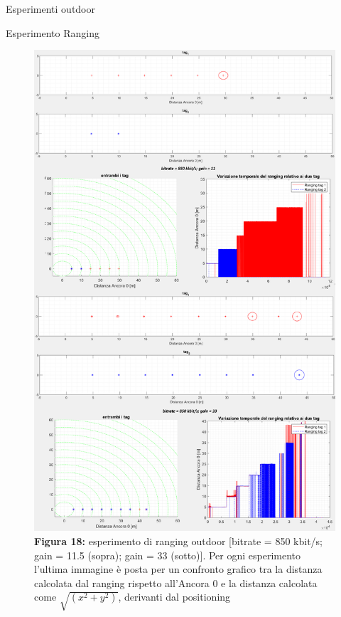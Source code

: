 \documentclass[12pt]{report}
\begin{document}
\begin{section}{Esperimenti outdoor}
\begin{subsection}{Esperimento Ranging}
			\begin{figure}[H]
				\centering
				\includegraphics[scale=0.17]{EspOut850}
	 			\caption{\textbf{Figura 18:} esperimento di ranging outdoor [bitrate = 850 kbit/s; gain = 11.5 (sopra); gain = 33 (sotto)]. Per ogni  esperimento l'ultima immagine è posta per un confronto grafico tra la distanza calcolata dal ranging rispetto all'Ancora 0 e la distanza calcolata come $\sqrt{(x^2+y^2)}$, 						derivanti dal positioning\label{EspOut850}}
			\end{figure}


\end{subsection}
\end{section}
\end{document}
